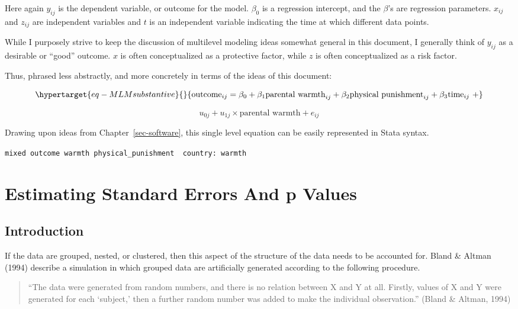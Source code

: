 \documentclass[
  letterpaper,
  DIV=11,
  numbers=noendperiod]{scrreprt}
\begin{document}
Here again \(y_{ij}\) is the dependent variable, or outcome for the
model. \(\beta_0\) is a regression intercept, and the \(\beta\)'s are
regression parameters. \(x_{ij}\) and \(z_{ij}\) are independent
variables and \(t\) is an independent variable indicating the time at
which different data points.

While I purposely strive to keep the discussion of multilevel modeling
ideas somewhat general in this document, I generally think of \(y_{ij}\)
as a desirable or ``good'' outcome. \(x\) is often conceptualized as a
protective factor, while \(z\) is often conceptualized as a risk factor.

Thus, phrased less abstractly, and more concretely in terms of the ideas
of this document:

\begin{equation}\protect\hypertarget{eq-MLMsubstantive}{}{\text{outcome}_{ij} = \beta_0 + \beta_1 \text{parental warmth}_{ij} + \beta_2 \text{physical punishment}_{ij} + \beta_3 \text{time}_{ij} \ + }\label{eq-MLMsubstantive}\end{equation}

\[u_{0j} + u_{1j} \times \text{parental warmth} + e_{ij}\]

Drawing upon ideas from Chapter~\ref{sec-software}, this single level
equation can be easily represented in Stata syntax.

\texttt{mixed\ outcome\ warmth\ physical\_punishment\ \textbar{}\textbar{}\ country:\ warmth}

\hypertarget{sec-pvalues}{%
\section{Estimating Standard Errors And p Values}\label{sec-pvalues}}

\hypertarget{introduction-1}{%
\subsection{Introduction}\label{introduction-1}}

If the data are grouped, nested, or clustered, then this aspect of the
structure of the data needs to be accounted for. Bland \& Altman (1994)
describe a simulation in which grouped data are artificially generated
according to the following procedure.

\begin{quote}
``The data were generated from random numbers, and there is no relation
between X and Y at all. Firstly, values of X and Y were generated for
each `subject,' then a further random number was added to make the
individual observation.'' (Bland \& Altman, 1994)
\end{quote}
\end{document}
